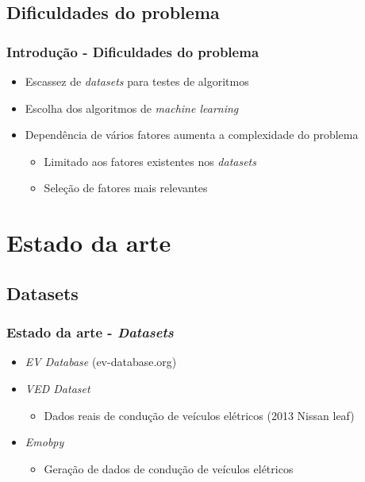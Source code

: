 \documentclass{beamer}
\begin{document}
\subsection[Dificuldades do problema]{Dificuldades do problema}
\begin{frame}
\frametitle{Introdução - Dificuldades do problema}

\begin{itemize}
	\item Escassez de \textit{datasets} para testes de algoritmos
	\item Escolha dos algoritmos de \textit{machine learning}
	\item Dependência de vários fatores aumenta a complexidade do problema
	 \begin{itemize}
			\item Limitado aos fatores existentes nos \textit{datasets}
			\item Seleção de fatores mais relevantes%
		  \end{itemize}
\end{itemize}

\end{frame}

\section[Estado da arte]{Estado da arte}
\subsection[Datasets]{Datasets}
\begin{frame}
\frametitle{Estado da arte - \textit{Datasets}}

\begin{itemize}
	\item \textit{EV Database} (ev-database.org) 
	\item \textit{VED Dataset} 
		  \begin{itemize}
			  \item Dados reais de condução de veículos elétricos (2013 Nissan leaf)  
		  \end{itemize}
	\item \textit{Emobpy} 
		  \begin{itemize}
			  \item Geração de dados de condução de veículos elétricos
		  \end{itemize}
\end{itemize}

\end{frame}
\end{document}
